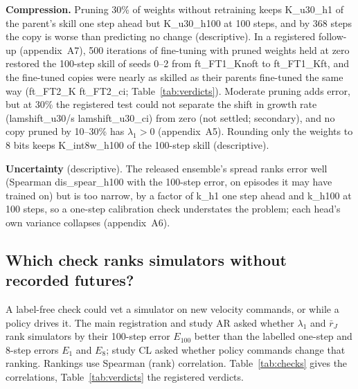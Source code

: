 \textbf{Compression.} Pruning 30\% of weights without retraining keeps {{K_u30_h1}} of the parent's skill one step
ahead but {{K_u30_h100}} at 100 steps, and by 368 steps the copy is worse than predicting no change (descriptive). In
a registered follow-up (appendix~A7), 500 iterations of fine-tuning with pruned weights held at zero restored the
100-step skill of seeds 0--2 from {{ft_FT1_Knoft}} to {{ft_FT1_Kft}}, and the fine-tuned copies were nearly as skilled
as their parents fine-tuned the same way ({{ft_FT2_K}} {{ft_FT2_ci}}; Table~\ref{tab:verdicts}). Moderate pruning adds error, but at 30\% the
registered test could not separate the shift in growth rate ({{lamshift_u30}}/s {{lamshift_u30_ci}}) from zero
(not settled; secondary), and no copy pruned by 10--30\% has $\lambda_1>0$ (appendix~A5). Rounding only the weights
to 8 bits keeps {{K_int8w_h100}} of the 100-step skill (descriptive).

\textbf{Uncertainty} (descriptive). The released ensemble's spread ranks error well (Spearman {{dis_spear_h100}} with
the 100-step error, on episodes it may have trained on) but is too narrow, by a factor of {{k_h1}} one step ahead and
{{k_h100}} at 100 steps, so a one-step calibration check understates the problem; each head's own variance collapses (appendix~A6).

\subsection{Which check ranks simulators without recorded futures?}\label{sec:checks}
A label-free check could vet a simulator on new velocity commands, or while a policy drives it. The main registration
and study AR asked whether $\lambda_1$ and $\bar r_J$ rank simulators by their 100-step error $E_{100}$ better than the labelled
one-step and 8-step errors $E_1$ and $E_8$; study CL asked whether policy commands change that ranking. Rankings use Spearman (rank) correlation. Table~\ref{tab:checks} gives the correlations, Table~\ref{tab:verdicts}
the registered verdicts.

